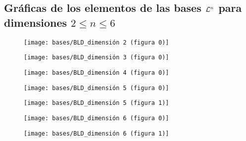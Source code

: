  

 
 
\subsection{Gráficas de los elementos de las bases $\mathcal{L}^{n}$ para dimensiones $2 \leq n \leq 6 $}

\begin{figure}[H]
	\centering
	\texttt{[image: bases/BLD\_dimensión 2 (figura 0)]}
\end{figure}

\begin{figure}[H]
	\centering
	\texttt{[image: bases/BLD\_dimensión 3 (figura 0)]}
\end{figure}

\begin{figure}[H]
	\centering
	\texttt{[image: bases/BLD\_dimensión 4 (figura 0)]}
\end{figure}

\begin{figure}[H]
	\centering
	\texttt{[image: bases/BLD\_dimensión 5 (figura 0)]}
\end{figure}


\begin{figure}[H]
	\centering
	\texttt{[image: bases/BLD\_dimensión 5 (figura 1)]}
\end{figure}

\begin{figure}[H]
	\centering
	\texttt{[image: bases/BLD\_dimensión 6 (figura 0)]}
\end{figure}

\begin{figure}[H]
	\centering
	\texttt{[image: bases/BLD\_dimensión 6 (figura 1)]}
\end{figure}